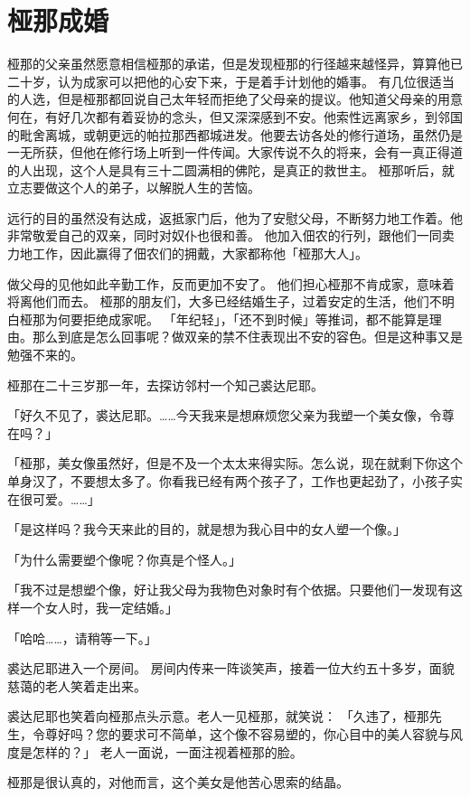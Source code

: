 \documentclass[twoside,openany]{book}
\begin{document}
\section{桠那成婚}\label{sec4.2}

桠那的父亲虽然愿意相信桠那的承诺，但是发现桠那的行径越来越怪异，算算他已二十岁，认为成家可以把他的心安下来，于是着手计划他的婚事。
有几位很适当的人选，但是桠那都回说自己太年轻而拒绝了父母亲的提议。他知道父母亲的用意何在，有好几次都有着妥协的念头，但又深深感到不安。他索性远离家乡，到邻国的毗舍离城，或朝更远的帕拉那西都城进发。他要去访各处的修行道场，虽然仍是一无所获，但他在修行场上听到一件传闻。大家传说不久的将来，会有一真正得道的人出现，这个人是具有三十二圆满相的佛陀，是真正的救世主。
桠那听后，就立志要做这个人的弟子，以解脱人生的苦恼。

远行的目的虽然没有达成，返抵家门后，他为了安慰父母，不断努力地工作着。他非常敬爱自己的双亲，同时对奴仆也很和善。
他加入佃农的行列，跟他们一同卖力地工作，因此赢得了佃农们的拥戴，大家都称他「桠那大人」。

做父母的见他如此辛勤工作，反而更加不安了。
他们担心桠那不肯成家，意味着将离他们而去。
桠那的朋友们，大多已经结婚生子，过着安定的生活，他们不明白桠那为何要拒绝成家呢。
「年纪轻」，「还不到时候」等推词，都不能算是理由。那么到底是怎么回事呢？做双亲的禁不住表现出不安的容色。但是这种事又是勉强不来的。

桠那在二十三岁那一年，去探访邻村一个知己裘达尼耶。

「好久不见了，裘达尼耶。……今天我来是想麻烦您父亲为我塑一个美女像，令尊在吗？」

「桠那，美女像虽然好，但是不及一个太太来得实际。怎么说，现在就剩下你这个单身汉了，不要想太多了。你看我已经有两个孩子了，工作也更起劲了，小孩子实在很可爱。……」

「是这样吗？我今天来此的目的，就是想为我心目中的女人塑一个像。」

「为什么需要塑个像呢？你真是个怪人。」

「我不过是想塑个像，好让我父母为我物色对象时有个依据。只要他们一发现有这样一个女人时，我一定结婚。」

「哈哈……，请稍等一下。」

裘达尼耶进入一个房间。
房间内传来一阵谈笑声，接着一位大约五十多岁，面貌慈蔼的老人笑着走出来。

裘达尼耶也笑着向桠那点头示意。老人一见桠那，就笑说：
「久违了，桠那先生，令尊好吗？您的要求可不简单，这个像不容易塑的，你心目中的美人容貌与风度是怎样的？」
老人一面说，一面注视着桠那的脸。

桠那是很认真的，对他而言，这个美女是他苦心思索的结晶。
\end{document}
